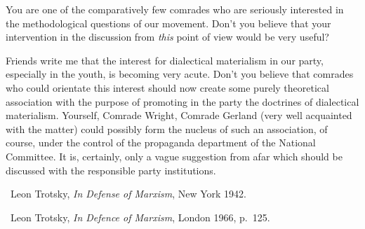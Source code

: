

You are one of the comparatively few comrades who are seriously interested in the methodological questions of our movement. Don’t you believe that your intervention in the discussion from \emph{this} point of view would be very useful?

Friends write me that the interest for dialectical materialism in our party, especially in the youth, is becoming very acute. Don’t you believe that comrades who could orientate this interest should now create some purely theoretical association with the purpose of promoting in the party the doctrines of dialectical materialism. Yourself, Comrade Wright, Comrade Gerland (very well acquainted with the matter) could possibly form the nucleus of such an association, of course, under the control of the propaganda department of the National Committee. It is, certainly, only a vague suggestion from afar which should be discussed with the responsible party institutions.


\begin{letterinfo}
	\firstpublished\ Leon Trotsky, \emph{In Defense of Marxism}, New York 1942.
	
	\checkedagainst\ Leon Trotsky, \emph{In Defence of Marxism}, London 1966, p.~125.
	
	\footnoteslatter
\end{letterinfo}